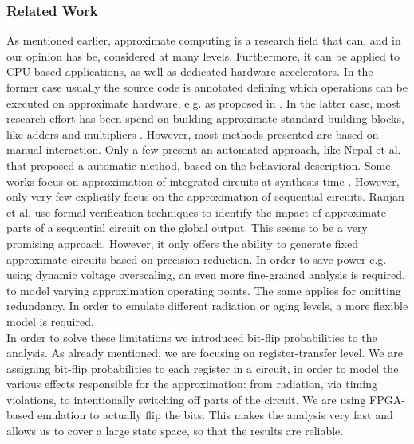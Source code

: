 \documentclass[conference]{IEEEtran}
\begin{document}
\subsubsection*{Related Work}
As mentioned earlier, approximate computing is a research field that can, and in our opinion has be, considered at many levels. Furthermore, it can be applied to CPU based applications, as well as dedicated hardware accelerators. In the former case usually the source code is annotated defining which operations can be executed on approximate hardware, e.g. as proposed in \cite{sampson_enerj:_2011}. In the latter case, most research effort has been spend on building approximate standard building blocks, like adders and multipliers \cite{huang_exploring_2011,chakrapani_highly_2008,gupta_impact:_2011,kahng_accuracy-configurable_2012}. However, most methods presented are based on manual interaction. Only a few present an automated approach, like Nepal et al. that proposed a automatic method, based on the behavioral description. Some works focus on approximation of integrated circuits at synthesis time \cite{miao_approximate_2013,shin_approximate_2010,choudhury_approximate_2008}. However, only very few explicitly focus on the approximation of sequential circuits. Ranjan et al. \cite{ranjan_aslan:_2014} use formal verification techniques to identify the impact of approximate parts of a sequential circuit on the global output. This seems to be a very promising approach. However, it only offers the ability to generate fixed approximate circuits based on precision reduction. In order to save power e.g. using dynamic voltage overscaling, an even more fine-grained analysis is required, to model varying approximation operating points. The same applies for omitting redundancy. In order to emulate different radiation or aging levels, a more flexible model is required. \\
In order to solve these limitations we introduced bit-flip probabilities to the analysis. As already mentioned, we are focusing on register-transfer level. We are assigning bit-flip probabilities to each register in a circuit, in order to model the various effects responsible for the approximation: from radiation, via timing violations, to intentionally switching off parts of the circuit. We are using FPGA-based emulation to actually flip the bits. This makes the analysis very fast and allows us to cover a large state space, so that the results are reliable.
\end{document}
